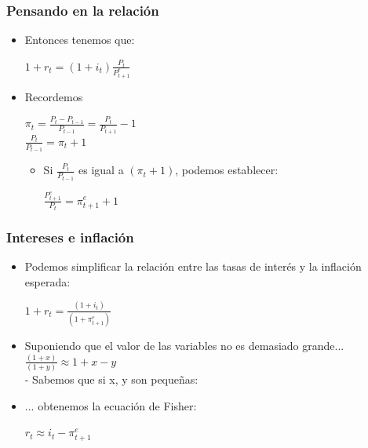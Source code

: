 \documentclass{beamer}
\begin{document}
\begin{frame}
\frametitle{Pensando en la relación}
\begin{itemize}
    \item Entonces tenemos que:\\
    \vspace{2mm}
    \begin{center}
        $1+r_t=(1+i_t)\frac{P_t}{P_{t+1}^{e}}$
    \end{center}
        \vspace{2mm}
    \item Recordemos \\      
    \begin{center}
        $\pi_t=\frac{P_t - P_{t-1}}{P_{t-1}}=\frac{P_t}{P_{t+1}} - 1 $ \\
    \vspace{2mm}
            $\frac{P_t}{P_{t-1}}= \pi_t + 1 $
    \end{center}
\begin{itemize}
    \item Si $\frac{P_t}{P_{t-1}}$ es igual a $(\pi_t + 1)$, podemos establecer:
    \vspace{2mm}
        \begin{center}
            $\frac{P_{t+1}^e}{P_{t}}= \pi_{t+1}^e + 1 $
    \end{center}
\end{itemize} 
\end{itemize}
\end{frame}

\begin{frame}
\frametitle{Intereses e inflación}
\begin{itemize}
    \item Podemos simplificar la relación entre las tasas de interés y la inflación esperada:
    \vspace{2mm}
    \begin{center}
        $1+r_t=\frac{(1+i_t)}{(1+\pi_{t+1}^e)}$
    \end{center}
        \vspace{2mm}
    \item Suponiendo que el valor de las variables no es demasiado grande... $\frac{(1+x)}{(1+y)} \approx 1 + x - y $\\
    - Sabemos que si x, y son pequeñas:     
    \item ... obtenemos la ecuación de Fisher: 
    \vspace{2mm}
        \begin{center}
        $r_t \approx i_t - \pi_{t+1}^e$
    \end{center}
\end{itemize}
\end{frame}
\end{document}
